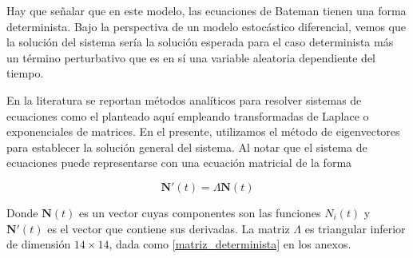 Hay que señalar que en este modelo, las ecuaciones de Bateman tienen una forma determinista. Bajo la perspectiva de un modelo estocástico diferencial, vemos que la solución del sistema sería la solución esperada para el caso determinista más un término perturbativo que es en sí una variable aleatoria dependiente del tiempo. 

En la literatura se reportan métodos analíticos para resolver sistemas de ecuaciones como el planteado aquí empleando transformadas de Laplace o exponenciales de matrices. En el presente, utilizamos el método de eigenvectores para establecer la solución general del sistema. Al notar que el sistema de ecuaciones puede representarse con una ecuación matricial de la forma

$$\mathbf{N'}(t)=\Lambda \mathbf{N}(t)$$

Donde $\mathbf{N}(t)$ es un vector cuyas componentes son las funciones $N_i(t)$ y $\mathbf{N'}(t)$ es el vector que contiene sus derivadas. La matriz $\Lambda$ es triangular inferior de dimensión $14\times14$, dada como \ref{matriz_determinista} en los anexos.


